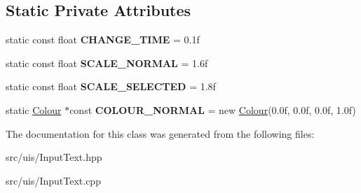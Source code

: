 \subsection*{Static Private Attributes}
\begin{DoxyCompactItemize}
\item 
\mbox{\label{class_flounder_1_1_input_text_acab46f406862f658b1c747f227080f13}} 
static const float {\bfseries C\+H\+A\+N\+G\+E\+\_\+\+T\+I\+ME} = 0.\+1f
\item 
\mbox{\label{class_flounder_1_1_input_text_a75b53542c3fa5638198ab71eb15520ca}} 
static const float {\bfseries S\+C\+A\+L\+E\+\_\+\+N\+O\+R\+M\+AL} = 1.\+6f
\item 
\mbox{\label{class_flounder_1_1_input_text_a3fe4571acc0cdc25558dc3a897c8b47e}} 
static const float {\bfseries S\+C\+A\+L\+E\+\_\+\+S\+E\+L\+E\+C\+T\+ED} = 1.\+8f
\item 
\mbox{\label{class_flounder_1_1_input_text_ab754a120e249b4bac0cf4356b35ba6ba}} 
static \hyperlink{class_flounder_1_1_colour}{Colour} $\ast$const {\bfseries C\+O\+L\+O\+U\+R\+\_\+\+N\+O\+R\+M\+AL} = new \hyperlink{class_flounder_1_1_colour}{Colour}(0.\+0f, 0.\+0f, 0.\+0f, 1.\+0f)
\end{DoxyCompactItemize}


The documentation for this class was generated from the following files\+:\begin{DoxyCompactItemize}
\item 
src/uis/Input\+Text.\+hpp\item 
src/uis/Input\+Text.\+cpp\end{DoxyCompactItemize}
